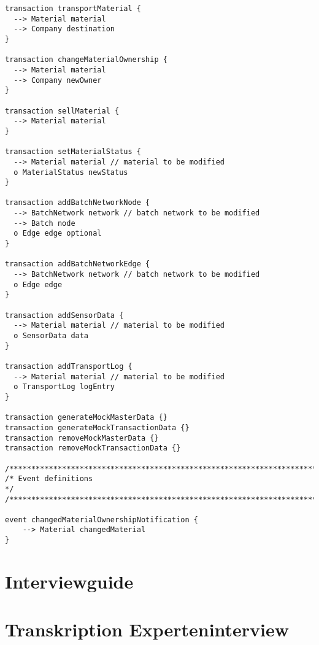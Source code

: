 \begin{lstlisting}[]
transaction transportMaterial {
  --> Material material
  --> Company destination
}

transaction changeMaterialOwnership {
  --> Material material
  --> Company newOwner
}

transaction sellMaterial {
  --> Material material
}

transaction setMaterialStatus {
  --> Material material // material to be modified
  o MaterialStatus newStatus
}

transaction addBatchNetworkNode {
  --> BatchNetwork network // batch network to be modified
  --> Batch node
  o Edge edge optional
}

transaction addBatchNetworkEdge {
  --> BatchNetwork network // batch network to be modified
  o Edge edge
}

transaction addSensorData {
  --> Material material // material to be modified
  o SensorData data
}

transaction addTransportLog {
  --> Material material // material to be modified
  o TransportLog logEntry
}

transaction generateMockMasterData {}
transaction generateMockTransactionData {}
transaction removeMockMasterData {}
transaction removeMockTransactionData {}

/*****************************************************************************/
/* Event definitions                                                         */
/*****************************************************************************/

event changedMaterialOwnershipNotification {
    --> Material changedMaterial
}
\end{lstlisting}

\section{Interviewguide}

\section{Transkription Experteninterview}

\newpage

